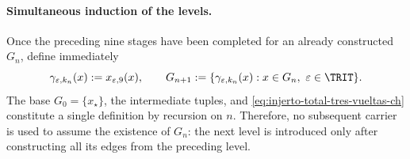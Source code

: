 \paragraph{Simultaneous induction of the levels.}
Once the preceding nine stages have been completed for an already constructed
\(G_n\), define immediately
\begin{equation}
 \gamma_{\varepsilon,k_n}(x):=x_{\varepsilon,9}(x),\qquad
 G_{n+1}:=\{\gamma_{\varepsilon,k_n}(x):
       x\in G_n,\ \varepsilon\in\TRIT\}.
 \label{eq:injerto-total-tres-vueltas-ch}
\end{equation}
\label{eq:tres-vueltas-tpk-ch}
The base \(G_0=\{x_\star\}\), the intermediate tuples, and
\eqref{eq:injerto-total-tres-vueltas-ch} constitute a single definition by
recursion on \(n\). Therefore, no subsequent carrier is used to assume the
existence of \(G_n\): the next level is introduced only after constructing all
its edges from the preceding level.


